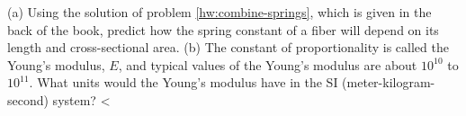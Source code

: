    (a) Using the solution of problem \ref{hw:combine-springs}, which is given
in the back of the book, predict how the spring constant of
a fiber will depend on its length and cross-sectional area.\hwendpart
(b) The constant of proportionality is called the Young's modulus, $E$, and typical values of the
Young's modulus are about $10^{10}$  to $10^{11}$. What
units would the Young's modulus have in the SI (meter-kilogram-second) system? <%
